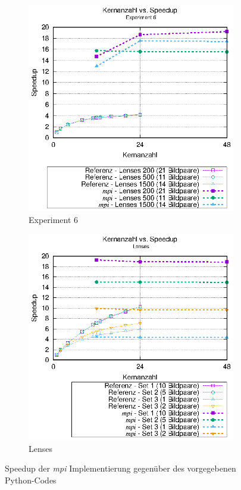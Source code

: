 \begin{center}
	\begin{figure}[htbp]
		\begin{subfigure}[b]{0.45\textwidth}
			\centering
			\includegraphics[width=\textwidth]{pdf/mpi_speedup_exp6}
			\caption{Experiment 6}
			\label{fig:mpi_speedup_exp6}
		\end{subfigure}
		\hfill
		\begin{subfigure}[b]{0.45\textwidth}
			\centering
			\includegraphics[width=\textwidth]{pdf/mpi_speedup_lenses}
			\caption{Lenses}
			\label{fig:mpi_speedup_lenses}
		\end{subfigure}
		\caption{Speedup der \textit{mpi} Implementierung gegenüber des vorgegebenen Python-Codes}
		\label{fig:mpi_speedup}
	\end{figure}
\end{center}

